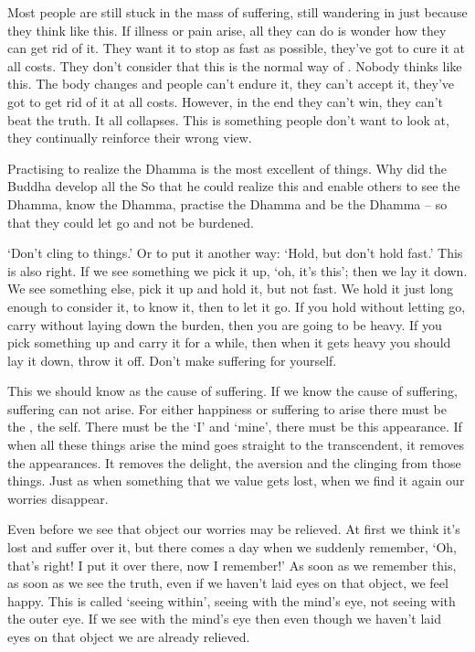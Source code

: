 Most people are still stuck in the mass of suffering, still wandering in  just because they think like this. If illness or pain arise, all they can do is wonder how they can get rid of it. They want it to stop as fast as possible, they've got to cure it at all costs. They don't consider that this is the normal way of . Nobody thinks like this. The body changes and people can't endure it, they can't accept it, they've got to get rid of it at all costs. However, in the end they can't win, they can't beat the truth. It all collapses. This is something people don't want to look at, they continually reinforce their wrong view. 

Practising to realize the Dhamma is the most excellent of things. Why did the Buddha develop all the  So that he could realize this and enable others to see the Dhamma, know the Dhamma, practise the Dhamma and be the Dhamma -- so that they could let go and not be burdened. 

`Don't cling to things.' Or to put it another way: `Hold, but don't hold fast.' This is also right. If we see something we pick it up, `oh, it's this'; then we lay it down. We see something else, pick it up and hold it, but not fast. We hold it just long enough to consider it, to know it, then to let it go. If you hold without letting go, carry without laying down the burden, then you are going to be heavy. If you pick something up and carry it for a while, then when it gets heavy you should lay it down, throw it off. Don't make suffering for yourself. 

This we should know as the cause of suffering. If we know the cause of suffering, suffering can not arise. For either happiness or suffering to arise there must be the , the self. There must be the `I' and `mine', there must be this appearance. If when all these things arise the mind goes straight to the transcendent, it removes the appearances. It removes the delight, the aversion and the clinging from those things. Just as when something that we value gets lost, when we find it again our worries disappear. 

Even before we see that object our worries may be relieved. At first we think it's lost and suffer over it, but there comes a day when we suddenly remember, `Oh, that's right! I put it over there, now I remember!' As soon as we remember this, as soon as we see the truth, even if we haven't laid eyes on that object, we feel happy. This is called `seeing within', seeing with the mind's eye, not seeing with the outer eye. If we see with the mind's eye then even though we haven't laid eyes on that object we are already relieved. 


